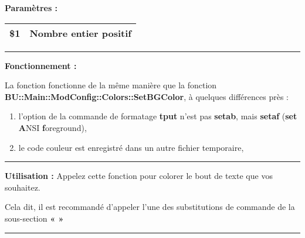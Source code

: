 \documentclass[a4paper,10pt]{article}
\begin{document}
\begin{justify}
    \textbf{Paramètres :}

    \begin{tabular}{|l|l|}
        \hline
        \textbf{\color{orange}\$1} & Nombre entier positif\\
        \hline
    \end{tabular}
\end{justify}


\par\noindent\rule{\textwidth}{0.4pt}

\begin{justify}
    \textbf{Fonctionnement :}

    La fonction fonctionne de la même manière que la fonction \textbf{\color{func}BU::Main::ModConfig::Colors::SetBGColor}, à quelques différences près :
    \begin{enumerate}
        \item l'option de la commande de formatage \textbf{\color{cmds}tput} n'est pas \textbf{setab}, mais \textbf{setaf} (\textbf{set} \textbf{A}NSI \textbf{f}oreground),
        \item le code couleur est enregistré dans un autre fichier temporaire,
    \end{enumerate}
\end{justify}




\par\noindent\rule{\textwidth}{0.4pt}

\begin{justify}
    \textbf{Utilisation :} Appelez cette fonction pour colorer le bout de texte que vos souhaitez.
\end{justify}

\begin{justify}
    Cela dit, il est recommandé d'appeler l'une des substitutions de commande de la sous-section \textbf{\color{sec2}«  »}
\end{justify}







\color{sec2}\par\noindent\rule{\textwidth}{0.4pt}\color{text}
\end{document}
